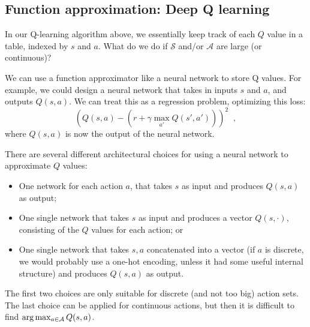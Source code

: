 \subsection{Function approximation: Deep Q learning}
In our Q-learning algorithm above, we essentially keep track of each
$Q$ value in a table, indexed by $s$ and $a$. What do we do if
$\mathcal{S}$ and/or $\mathcal{A}$ are large (or continuous)?

We can use a function approximator like a neural network to store Q
values. For example, we could design a neural network that takes in
inputs $s$ and $a$, and outputs $Q(s,a)$. We can treat this as a
regression problem, optimizing this loss:
\begin{equation}
  \left(Q(s,a) - (r + \gamma \max_{a'}Q(s',a'))\right)^2\;\;,
\end{equation}
where $Q(s, a)$ is now the output  of the neural network.

There are several different architectural choices for using a
neural network to approximate $Q$ values:
\begin{itemize}
  \item One network for each action $a$, that takes $s$ as input and
        produces $Q(s, a)$ as output;
  \item One single network that takes $s$ as input and produces a vector
        $Q(s, \cdot)$, consisting of the $Q$ values for each action; or
  \item One single network that takes $s, a$ concatenated into a vector
        (if $a$ is discrete, we would probably use a one-hot encoding,
        unless it had some useful internal structure) and produces $Q(s, a)$
        as output.
\end{itemize}


The first two choices are only suitable for discrete (and not too big)
action sets.  The last choice can be applied for continuous actions,
but then it is difficult to find ${\rm arg}\max_{a \in \mathcal{A}} Q(s, a)$.


